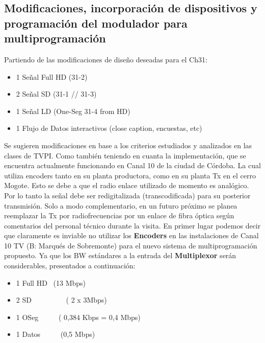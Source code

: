 \documentclass[a4paper,11pt]{article} %
\begin{document}

\newpage
\subsection{Modificaciones, incorporaci\'on de dispositivos y
programación del modulador para multiprogramación}

Partiendo de las modificaciones de dise\~no deseadas para el Ch31:

\begin{itemize}
\item 1 Se\~nal Full HD (31-2)
\item 2 Se\~nal SD (31-1 // 31-3) 
\item 1 Se\~nal LD (One-Seg 31-4 from HD) 
\item 1 Flujo de Datos interactivos (close caption, encuestas, etc)
\end{itemize} 

Se sugieren modificaciones en base a los criterios estudiados y
analizados en las clases de TVPI. Como tambi\'en teniendo en cuanta la
implementaci\'on, que se encuentra actualmente funcionando en Canal 10
de la ciudad de C\'ordoba. La cual utiliza encoders tanto en su planta
productora, como en su planta Tx en el cerro Mogote. Esto se
debe a que el radio enlace utilizado de momento es anal\'ogico.
Por lo tanto la se\~nal debe ser redigitalizada (transcodificada)
para su posterior transmisi\'on. Solo a modo complementario, en un
futuro pr\'oximo se planea reemplazar la Tx por radiofrecuencias por un
enlace de fibra \'optica seg\'un comentarios del personal t\'ecnico
durante la visita.
En primer lugar podemos decir que claramente es inviable no utilizar los
\textbf{Encoders} en las instalaciones de Canal 10 TV (B:
Marqu\'es de Sobremonte) para el nuevo sistema de multiprogramación
propuesto. Ya que los BW est\'andares a la entrada del
\textbf{Multiplexor} ser\'an considerables, presentados a
continuaci\'on: 


\begin{itemize}
\item 1 Full HD \ (13 Mbps)
\item 2 SD \ \ \ \ \ \ \ \ \  ( 2 x 3Mbps) 
\item 1 OSeg \ \ \ \ \  ( 0,384 Kbps = 0,4 Mbps)
\item 1 Datos \ \ \ \ \ (0,5 Mbps)
\end{itemize}
\end{document}
